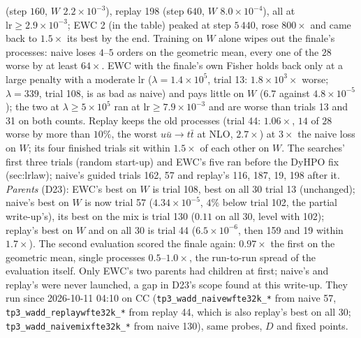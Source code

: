 \documentclass[11pt]{article}
\newcommand{\code}[1]{\texttt{#1}}
\begin{document}
(step $160$, $W$ $2.2\times10^{-3}$), replay 198 (step $640$, $W$ $8.0\times10^{-4}$), all at $\mathrm{lr}\ge2.9\times10^{-3}$;
EWC 2 (in the table) peaked at step $5\,440$, rose $800\times$ and came back to $1.5\times$ its best by the end.
Training on $W$ alone wipes out the finale's processes: naive loses $4$--$5$ orders on the geometric mean, every one of the
$28$ worse by at least $64\times$. EWC with the finale's own Fisher holds back only at a large penalty with a moderate lr
($\lambda=1.4\times10^{5}$, trial 13: $1.8\times10^{3}\times$ worse; $\lambda=339$, trial 108, is as bad as naive) and pays
little on $W$ ($6.7$ against $4.8\times10^{-5}$); the two at $\lambda\ge5\times10^{5}$ ran at $\mathrm{lr}\ge7.9\times10^{-3}$
and are worse than trials 13 and 31 on both counts. Replay keeps the old processes (trial 44: $1.06\times$, $14$ of $28$
worse by more than $10\%$, the worst $u\bar u\to t\bar t$ at NLO, $2.7\times$) at $3\times$ the naive loss on $W$; its four
finished trials sit within $1.5\times$ of each other on $W$. The searches' first three trials (random start-up) and EWC's
five ran before the DyHPO fix (sec:lrlaw); naive's guided trials 162, 57 and replay's 116, 187, 19, 198 after it.
\emph{Parents} (D23): EWC's best on $W$ is trial 108, best on all $30$ trial 13 (unchanged); naive's best on $W$ is now
trial 57 ($4.34\times10^{-5}$, $4\%$ below trial 102, the partial write-up's), its best on the mix is trial 130 ($0.11$ on all $30$, level with 102); replay's best on $W$ and on all $30$ is trial 44
($6.5\times10^{-6}$, then 159 and 19 within $1.7\times$). The second evaluation scored the finale again: $0.97\times$ the first on
the geometric mean, single processes $0.5$--$1.0\times$, the run-to-run spread of the evaluation itself.
Only EWC's two parents had children at first; naive's and replay's were never launched, a gap in D23's scope found at
this write-up. They run since 2026-10-11 04:10 on CC (\code{tp3\_wadd\_naivewfte32k\_*} from naive 57,
\code{tp3\_wadd\_replaywfte32k\_*} from replay 44, which is also replay's best on all $30$; \code{tp3\_wadd\_naivemixfte32k\_*}
from naive 130), same probes, $D$ and fixed points.
\end{document}
